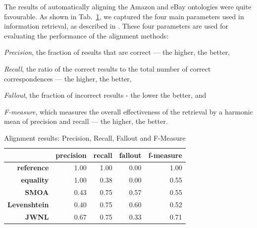 The results of automatically aligning the Amazon and eBay ontologies were quite favourable. As shown in Tab.~\ref{table_results}, we captured the four main parameters used in information retrieval, as described in \cite{olson2008advanced}. These four parameters are used for evaluating the performance of the alignment methods: 
\begin{inparaenum}[(1)]
    \item \textit{Precision}, the fraction of results that are correct --- the higher, the better, 
    \item \textit{Recall}, the ratio of the correct results to the total number of correct correspondences --- the higher, the better, 
    \item \emph{Fallout}, the fraction of incorrect results - the lower the better, and 
    \item \emph{F-measure}, which measures the overall effectiveness of the retrieval by a harmonic mean of precision and recall --- the higher, the better.
\end{inparaenum}

\begin{table}
    \centering
    \caption{Alignment results: Precision, Recall, Fallout and F-Measure}
    \label{table_results}

    \begin{tabular}{rrrrr}
        \toprule
        & \textbf{precision} & \textbf{recall} & \textbf{fallout} & \textbf{f-measure}\\
        \midrule
        \textbf{reference} & 1.00 & 1.00 & 0.00 & 1.00\\
        \textbf{equality} & 1.00 & 0.38 & 0.00 & 0.55\\
        \textbf{SMOA} & 0.43 & 0.75 & 0.57 & 0.55\\
        \textbf{Levenshtein} & 0.40 & 0.75 & 0.60 & 0.52\\
        \textbf{JWNL} & 0.67 & 0.75 & 0.33 & 0.71\\
        \bottomrule
    \end{tabular}
\end{table}

